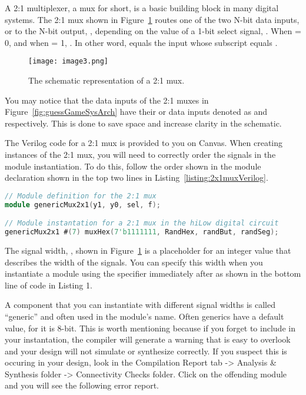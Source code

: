 A 2:1 multiplexer, a mux for short, is a basic building block in many
digital systems. The 2:1 mux shown in Figure~\ref{fig:2x1MuxSymbol}
routes one of the two
N-bit data inputs,  or  to the N-bit output, , depending
on the value of a 1-bit select signal, . When  = 0,
 and when  = 1, . In other word, 
equals the  input whose subscript equals .

\begin{figure}[ht]
    \texttt{[image: image3.png]}
    \caption{The schematic representation of a 2:1 mux.}
    \label{fig:2x1MuxSymbol}
\end{figure}

You may notice that the data inputs of the 2:1 muxes in Figure~\ref{fig:guessGameSysArch}
have
their  or  data
inputs denoted as  and  respectively. This is done to save space
and increase clarity in the schematic.

The Verilog code for a 2:1 mux is provided to you on Canvas. When
creating instances of the 2:1 mux, you will need to correctly order the
signals in the module instantiation. To do this, follow the
order shown in the module declaration shown in the top two lines in
Listing~\ref{listing:2x1muxVerilog}.

\begin{lstlisting}[language=Verilog,
 caption={Top, module definition for a 2:1 mux.  Bottom, module instantation
 of a 2:1 mux in Figure~\ref{fig:guessGameSysArch}.},
 label={listing:2x1muxVerilog},
 frame=single]
// Module definition for the 2:1 mux
module genericMux2x1(y1, y0, sel, f);

// Module instantation for a 2:1 mux in the hiLow digital circuit
genericMux2x1 #(7) muxHex(7'b1111111, RandHex, randBut, randSeg);
\end{lstlisting}

The signal width, , shown in Figure~\ref{fig:2x1MuxSymbol} is a
placeholder for an integer value that describes the width of the 
signals.  You can specify this width when you instantiate a  module using the \hdl{\#()}
specifier immediately after  as shown in the bottom line of code in Listing 1.

A component
that you can instantiate with different signal widths is called
``generic'' and often used in the module's name.  Often generics
have a default value, for  it is 8-bit. This is
worth mentioning because if you forget to include  in your
instantation, the compiler will generate a warning that is easy to
overlook and your design will not simulate or synthesize correctly.
If you suspect this is occuring in your design,  look in the Compilation
Report tab -\textgreater{} Analysis \& Synthesis folder -\textgreater{}
Connectivity Checks folder. Click on the offending module and you will
see the following error report.


